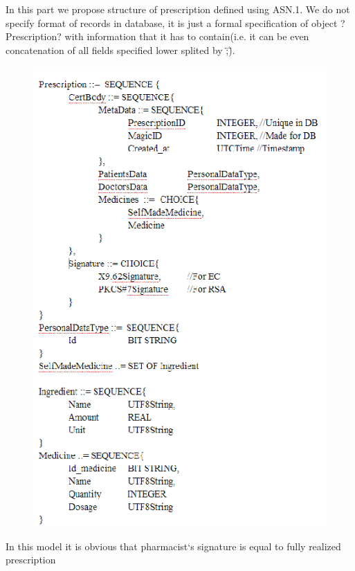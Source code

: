 \chapter {}
In this part we propose structure of prescription defined using ASN.1. We do not specify format of records in database, it is just a formal specification of object ?Prescription? with information that it has to contain(i.e. it can be even concatenation of all fields specified lower splited by \";\").

\begin{figure}[h]
\centering
\includegraphics[width=\textwidth,height=\textheight,keepaspectratio]{doctor/asn1.png}
\end{figure} 
In this model it is obvious that pharmacist`s signature is equal to fully realized prescription


